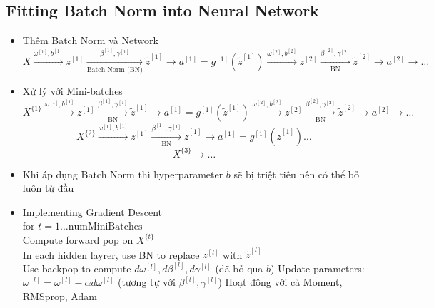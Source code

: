 \documentclass[12pt,a4paper]{report}
\begin{document}
		\subsection{Fitting Batch Norm into Neural Network}
			\begin{itemize}
				\item Thêm Batch Norm và Network
					\begin{equation*}
						X \xrightarrow{\omega^{[1]}, b^{[1]}} z^{[1]} \xrightarrow[\text{Batch Norm (BN)}]{\beta^{[1]}, \gamma^{[1]}} \tilde{z}^{[1]} \xrightarrow{} a^{[1]} = g^{[1]}(\tilde{z}^{[1]}) \xrightarrow{\omega^{[2]}, b^{[2]}} z^{[2]} \xrightarrow[\text{BN}]{\beta^{[2]}, \gamma^{[2]}} \tilde{z}^{[2]} \xrightarrow{} a^{[2]} \xrightarrow{} \ldots 
					\end{equation*}
				\item Xử lý với Mini-batches
					\begin{equation*}
						X^{\{1\}} \xrightarrow{\omega^{[1]}, b^{[1]}} z^{[1]} \xrightarrow[\text{BN}]{\beta^{[1]}, \gamma^{[1]}} \tilde{z}^{[1]} \xrightarrow{} a^{[1]} = g^{[1]}(\tilde{z}^{[1]}) \xrightarrow{\omega^{[2]}, b^{[2]}} z^{[2]} \xrightarrow[\text{BN}]{\beta^{[2]}, \gamma^{[2]}} \tilde{z}^{[2]} \xrightarrow{} a^{[2]} \xrightarrow{} \ldots 
					\end{equation*}
					\begin{equation*}
						X^{\{2\}} \xrightarrow{\omega^{[1]}, b^{[1]}} z^{[1]} \xrightarrow[\text{BN}]{\beta^{[1]}, \gamma^{[1]}} \tilde{z}^{[1]} \xrightarrow{} a^{[1]} = g^{[1]}(\tilde{z}^{[1]}) \ldots 
					\end{equation*}
					\begin{equation*}
						X^{\{3\}} \xrightarrow{} \ldots
					\end{equation*}
				\item Khi áp dụng Batch Norm thì hyperparameter $ b $ sẽ bị triệt tiêu nên có thể bỏ luôn từ đầu
				\item Implementing Gradient Descent\\
					\tabto{0.5cm} for $ t = 1 \ldots \text{numMiniBatches}  $\\
					\tabto{1cm} Compute forward pop on $ X^{\{t\}} $\\
					\tabto{1.5cm} In each hidden layrer, use BN to replace $ z^{[l]}$ with $\tilde{z}^{[l]}$\\
					\tabto{1cm} Use backpop to compute $ d\omega^{[l]}, d\beta^{[l]}, d\gamma^{[l]} $ (đã bỏ qua $b$)
					\tabto{1cm} Update parameters: $ \omega^{[l]} = \omega^{[l]} - \alpha d\omega^{[l]} $ (tương tự với $ \beta^{[l]}, \gamma^{[l]} $)
					\tabto{0.5cm} Hoạt động với cả Moment, RMSprop, Adam
			\end{itemize}
\end{document}
